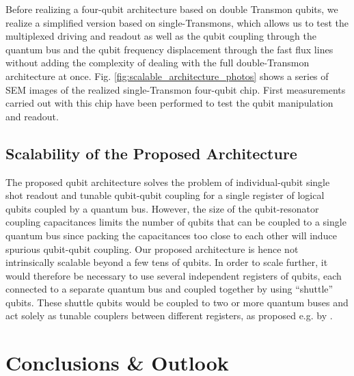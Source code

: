 \smallskip

Before realizing a four-qubit architecture based on double Transmon qubits, we realize a simplified version based on single-Transmons, which allows us to test the multiplexed driving and readout as well as the qubit coupling through the quantum bus and the qubit frequency displacement through the fast flux lines without adding the complexity of dealing with the full double-Transmon architecture at once. Fig. \ref{fig:scalable_architecture_photos} shows a series of SEM images of the realized single-Transmon four-qubit chip. First measurements carried out with this chip have been performed to test the qubit manipulation and readout.

\subsection{Scalability of the Proposed Architecture}

The proposed qubit architecture solves the problem of individual-qubit single shot readout and tunable qubit-qubit coupling for a single register of logical qubits coupled by a quantum bus. However, the size of the qubit-resonator coupling capacitances limits the number of qubits that can be coupled to a single quantum bus since packing the capacitances too close to each other will induce spurious qubit-qubit coupling. Our proposed architecture is hence not intrinsically scalable beyond a few tens of qubits. In order to scale further, it would therefore be necessary to use several independent registers of qubits, each connected to a separate quantum bus and coupled together by using ``shuttle'' qubits. These shuttle qubits would be coupled to two or more quantum buses and act solely as tunable couplers between different registers, as proposed e.g. by \citep{divincenzo_physical_2000,palacios-laloy_superconducting_2010}.

\section{Conclusions \& Outlook}

